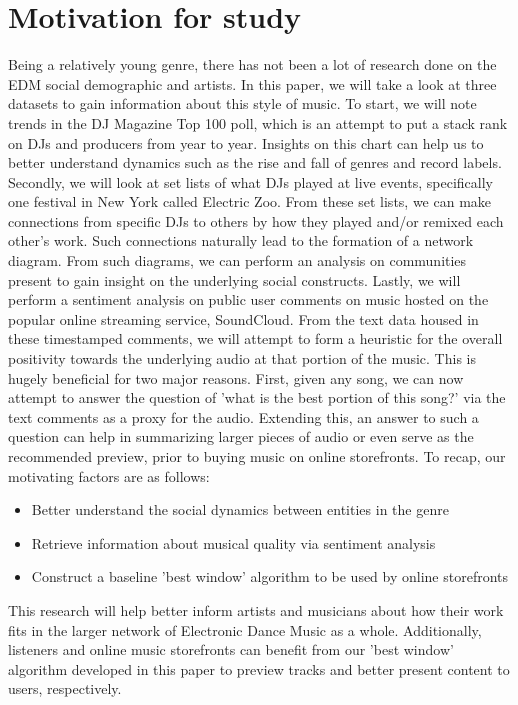 \documentclass[12pt]{dalcsthesis}
\begin{document}
\section{Motivation for study}

Being a relatively young genre, there has not been a lot of research done on the EDM social demographic and artists. In this paper, we will take a look at three datasets to gain information about this style of music. To start, we will note trends in the DJ Magazine Top 100 poll, which is an attempt to put a stack rank on DJs and producers from year to year. Insights on this chart can help us to better understand dynamics such as the rise and fall of genres and record labels. Secondly, we will look at set lists of what DJs played at live events, specifically one festival in New York called Electric Zoo. From these set lists, we can make connections from specific DJs to others by how they played and/or remixed each other's work. Such connections naturally lead to the formation of a network diagram. From such diagrams, we can perform an analysis on communities present to gain insight on the underlying social constructs. Lastly, we will perform a sentiment analysis on public user comments on music hosted on the popular online streaming service, SoundCloud. From the text data housed in these timestamped comments, we will attempt to form a heuristic for the overall positivity towards the underlying audio at that portion of the music. This is hugely beneficial for two major reasons. First, given any song, we can now attempt to answer the question of 'what is the best portion of this song?' via the text comments as a proxy for the audio. Extending this, an answer to such a question can help in summarizing larger pieces of audio or even serve as the recommended preview, prior to buying music on online storefronts. To recap, our motivating factors are as follows:

\begin{itemize}
  \item Better understand the social dynamics between entities in the genre
  \item Retrieve information about musical quality via sentiment analysis
  \item Construct a baseline 'best window' algorithm to be used by online storefronts
\end{itemize}

This research will help better inform artists and musicians about how their work fits in the larger network of Electronic Dance Music as a whole. Additionally, listeners and online music storefronts can benefit from our 'best window' algorithm developed in this paper to preview tracks and better present content to users, respectively. 
\end{document}
